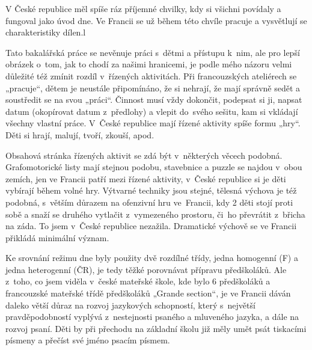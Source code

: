 	 
V České republice měl spíše ráz příjemné chvilky, kdy si všichni povídaly a fungoval jako úvod dne. Ve Francii se už během této chvíle pracuje a vysvětlují se charakteristiky dílen.l




		Tato bakalářská práce se nevěnuje práci s dětmi a přístupu k nim, ale pro lepší obrázek o tom, jak to chodí za našimi hranicemi, je podle mého názoru velmi důležité též zmínit rozdíl v řízených aktivitách. Při francouzských ateliérech se „pracuje“, dětem je neustále připomínáno, že si nehrají, že mají správně sedět a soustředit se na svou „práci“. Činnost musí vždy dokončit, podepsat si ji, napsat datum (okopírovat datum z předlohy) a vlepit do svého sešitu, kam si vkládají všechny vlastní práce. V České republice mají řízené aktivity spíše formu „hry“. Děti si hrají, malují, tvoří, zkouší, apod. 


		Obsahová stránka řízených aktivit se zdá být v některých věcech podobná. Grafomotorické listy mají stejnou podobu, stavebnice a puzzle se najdou v obou zemích, jen ve Francii patří mezi řízené aktivity, v České republice si je děti vybírají během volné hry. Výtvarné techniky jsou stejné, tělesná výchova je též podobná, s větším důrazem na ofenzivní hru ve Francii, kdy 2 děti stojí proti sobě a snaží se druhého vytlačit z vymezeného prostoru, či ho převrátit z břicha na záda. To jsem v České republice nezažila. Dramatické výchově se ve Francii přikládá minimální význam. 

		Ke srovnání režimu dne byly použity dvě rozdílné třídy, jedna homogenní (F) a jedna heterogenní (ČR), je tedy těžké porovnávat přípravu předškoláků. Ale z toho, co jsem viděla v české mateřské škole, kde bylo 6 předškoláků a francouzské mateřské třídě předškoláků „Grande section“, je ve Francii dáván daleko větší důraz na rozvoj jazykových schopností, který s největší pravděpodobností vyplývá z nestejnosti psaného a mluveného jazyka, a dále na rozvoj psaní. Děti by při přechodu na základní školu již měly umět psát tiskacími písmeny a přečíst své jméno psacím písmem. 

